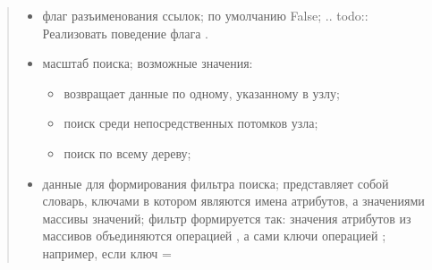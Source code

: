 \documentclass[a4paper,10pt,russian]{sphinxmanual}
\begin{document}
\begin{fulllineitems}
\begin{fulllineitems}
\begin{description}
\begin{quote}
\begin{itemize}
\begin{description}
\end{description}

\item {} \begin{description}
\sphinxAtStartPar
флаг разъименования ссылок; по умолчанию \sphinxhyphen{} False;
.. todo:: Реализовать поведение флага .

\end{description}

\item {} \begin{description}
\sphinxAtStartPar
масштаб поиска; возможные значения:
\begin{itemize}
\item {}
 \sphinxhyphen{} возвращает данные по одному, указанному в  узлу;

\item {}
 \sphinxhyphen{} поиск среди непосредственных потомков узла;

\item {}
 \sphinxhyphen{} поиск по всему дереву;

\end{itemize}

\end{description}

\item {} \begin{description}
\sphinxAtStartPar
данные для формирования фильтра поиска; 
представляет собой словарь, ключами в котором являются имена
атрибутов, а значениями \sphinxhyphen{} массивы значений; фильтр формируется
так: значения атрибутов из массивов объединяются операцией
, а сами ключи \sphinxhyphen{} операцией ;
например, если ключ  =

\begin{sphinxVerbatim}[commandchars=\\\{\}]
\PYG{p}{[}\PYG{p}{],}
\PYG{p}{[}\PYG{p}{]}
\end{sphinxVerbatim}


\end{description}
\end{itemize}
\end{quote}
\end{description}
\end{fulllineitems}
\end{fulllineitems}
\end{document}
